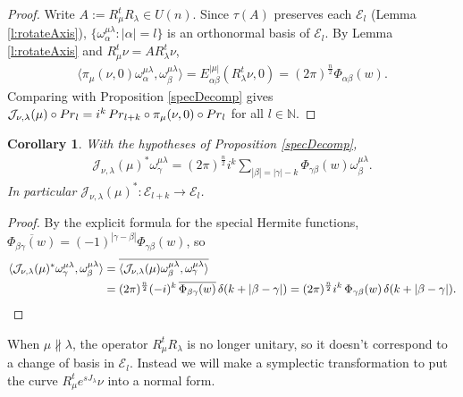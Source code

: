 \documentclass[11pt]{amsart}
\theoremstyle{plain}
\newtheorem{corollary}[theorem]{Corollary}
\theoremstyle{definition}
\theoremstyle{remark}
\numberwithin{equation}{section}
\def\cE{\mathcal{E}}
\def\cJ{\mathcal{J}}
\def\N{{\mathbb N}}%
\numberwithin{equation}{section}
\begin{document}
\begin{proof}
	Write $A:=R_\mu^tR_\lambda\in U(n)$. Since $\tau(A)$ preserves each $\cE_l$ (Lemma \ref{l:rotateAxis}), $\{\omega^{\mu\lambda}_\alpha: |\alpha|=l\}$ is an orthonormal basis of $\cE_l$. By Lemma \ref{l:rotateAxis} and $R_\mu^t\nu=AR_\lambda^t\nu$,
	\begin{align*}
		\langle \pi_\mu(\nu, 0)\omega^{\mu\lambda}_\alpha, \omega^{\mu\lambda}_\beta\rangle=E^{|\mu|}_{\alpha\beta}(R_\lambda^t\nu, 0)=(2\pi)^{\frac{n}{2}}\Phi_{\alpha\beta}(w).
	\end{align*}
	Comparing with Proposition \ref{specDecomp} gives $\cJ_{\nu, \lambda}(\mu)\circ{{\rm Pr}}_{l}=i^k\,{{\rm Pr}}_{l+k}\circ\pi_\mu(\nu, 0)\circ{{\rm Pr}}_{l}$ for all $l\in \N$.
\end{proof}
\begin{corollary}
	With the hypotheses of Proposition \ref{specDecomp},
	\begin{align*}
		\cJ_{\nu, \lambda}(\mu)^*\omega_{\gamma}^{\mu\lambda}=(2\pi)^{\frac{n}{2}}i^k\sum_{|\beta|=|\gamma|-k}\Phi_{\gamma\beta}(w)\omega_\beta^{\mu\lambda}.
	\end{align*}
	In particular $\cJ_{\nu, \lambda}(\mu)^*: \cE_{l+k}\to \cE_{l}$.
\end{corollary}
\begin{proof}
	By the explicit formula for the special Hermite functions, $\overline{\Phi_{\beta\gamma}(w)}=(-1)^{|\gamma-\beta|}\Phi_{\gamma\beta}(w)$, so
	\begin{align*}
		\langle \cJ_{\nu, \lambda}(\mu)^*\omega_\gamma^{\mu\lambda}, \omega_\beta^{\mu\lambda}\rangle
		&=\overline{\langle\cJ_{\nu, \lambda}(\mu)\omega_\beta^{\mu\lambda}, \omega_\gamma^{\mu\lambda}\rangle}\\
		&=(2\pi)^{\frac{n}{2}}(-i)^k\,\overline{\Phi_{\beta\gamma}(w)}\,\delta(k+|\beta-\gamma|)
		=(2\pi)^{\frac{n}{2}}i^k\,\Phi_{\gamma\beta}(w)\,\delta(k+|\beta-\gamma|).\qedhere
	\end{align*}
\end{proof}

When $\mu\not\parallel\lambda$, the operator $R_\mu^tR_\lambda$ is no longer unitary, so it doesn't correspond to a change of basis in $\cE_l$. Instead we will make a symplectic transformation to put the curve $R_\mu^te^{sJ_\lambda}\nu$ into a normal form. 
\end{document}
